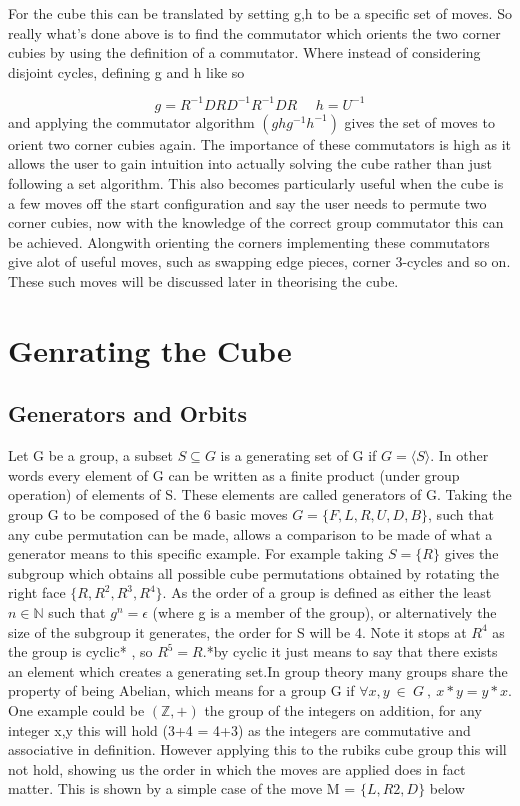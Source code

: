 \documentclass{article}
\newcounter{theo}[section]\setcounter{theo}{0}
\newcounter{prop}[section]\setcounter{prop}{0}
\newcounter{lem}[section]\setcounter{lem}{0}
\begin{document}
For the cube this can be translated by setting g,h to be a specific set of moves. So really what's done above is to find the commutator which orients the two corner cubies by using the definition of a commutator. Where instead of considering disjoint cycles, defining g and h like so

\begin{equation}\label{orient}
	g = R^{-1}DRD^{-1}R^{-1}DR\ \ \ \ \ \ 
    h = U^{-1}
\end{equation}
and applying the commutator algorithm $(ghg^{-1}h^{-1})$ gives the set of moves to orient two corner cubies again. The importance of these commutators is high as it allows the user to gain intuition into actually solving the cube rather than just following a set algorithm. This also becomes particularly useful when the cube is a few moves off the start configuration and say the user needs to permute two corner cubies, now with the knowledge of the correct group commutator this can be achieved. Alongwith orienting the corners implementing these commutators give alot of useful moves, such as swapping edge pieces, corner 3-cycles and so on. These such moves will be discussed later in theorising the cube.

\section{Genrating the Cube}
\subsection{Generators and Orbits}
Let G be a group, a subset $S\subseteq G$ is a generating set of G if $G =\langle S\rangle $. In other words every element of G can be written as a finite product (under group operation) of elements of S. These elements are called generators of G. Taking the group G to be composed of the 6 basic moves  $G= \{{F,L,R,U,D,B}\}$, such that  any cube permutation can be made, allows a comparison to be made of what a generator means to this specific example.  For example taking $S=\{R\}$ gives the subgroup which obtains all possible cube permutations obtained by rotating the right face $\{R,R^2,R^3,R^4\}$. As the order of a group is defined as either the least $n \in \mathbb{N}$ such that $g^n = \epsilon$ (where g is a member of the group),  or alternatively the size of the subgroup it generates, the order for S will be 4. Note it stops at $R^4$ as the group is cyclic* , so $R^5= R$.*by cyclic it just means to say that there exists an element which creates a generating set.\newline In group theory many groups share the property of being Abelian, which means for a group G if $\forall x,y\ \in\ G\ ,\ x*y=y*x$. One example could be $(\mathbb{Z},+)$ the group of the integers on addition, for any integer x,y this will hold (3+4 = 4+3) as the integers are commutative and associative in definition.
However applying this to the rubiks cube group this will not hold, showing us the order in which the moves are applied does in fact matter. This is shown by a simple case of the move M = $\{L,R2,D\}$ below
\end{document}
